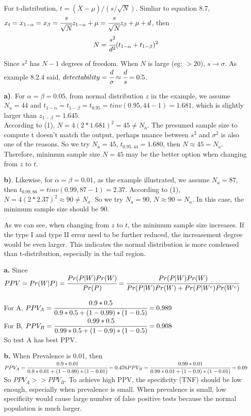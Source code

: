 \documentclass[12pt,a4paper]{article}
\begin{document}
For t-distribution, $t=(\overline{X}-\mu)/(s/\sqrt{N})$. Simliar to equation 8.7, \\ 
$x_t=x_{1-\alpha}=x_{\beta}=\cfrac{s}{\sqrt{N}}z_{1-\alpha}+\mu=\cfrac{s}{\sqrt{N}}z_{\beta}+\mu+d$, then
\begin{equation}
N=\cfrac{s^2}{d^2}(t_{1-\alpha}+t_{1-\beta})^2
\end{equation}

\noindent Since $s^2$ has $N-1$ degrees of freedom. When $N$ is large (eg: $>20$), $s\rightarrow \sigma$. As example 8.2.4 said, $detectability=\cfrac{d}{\sigma}\approx\cfrac{d}{s}=0.5$. 

\textbf{a)}. For $\alpha=\beta=0.05$, from normal distribution $z$ in the example, we assume $N_a=44$ and $t_{1-\alpha}=t_{1-\beta}=t_{0.95}=tinv(0.95,44-1)=1.681$, which is slightly larger than $z_{1-\beta}=1.645$. \\
According to (1), $N=4(2*1.681)^2=45\ne N_a$. The presumed sample size to compute t doesn't match the output, perhaps nuance between $s^2$ and $\sigma^2$ is also one of the reasons. So we try $N_a=45$, $t_{0.95,44}=1.680$, then $N\approx45=N_a$. Therefore, minimum sample size $N=45$ may be the better option when changing from  $z$ to $t$.

\textbf{b)}. Likewise, for $\alpha=\beta=0.01$, as the example illustrated, we assume $N_a=87$, then $t_{0.99,86}=tinv(0.99,87-1)=2.37$. According to (1), $N=4(2*2.37)^2\approx90\ne N_a$. So we try $N_a=90$, $N\approx90=N_a$. In this case, the minimum sample size should be 90.

As we can see, when changing from $z$ to $t$, the minimum sample size increases. If the type I and type II error need to be further reduced, the increasement degree would be even larger. This indicates the normal distribution is more condensed than t-distribution, especially in the tail region. 

\newpage
{}
\textbf{a.} Since $PPV=Pr(W|P)\\=\cfrac{Pr(P|W)Pr(W)}{Pr(P)}=\cfrac{Pr(P|W)Pr(W)}{Pr(P|W)Pr(W)+Pr(P|W^c)Pr(W^c)}$

\noindent For A, $PPV_A=\cfrac{0.9*0.5}{0.9*0.5+(1-0.99)*(1-0.5)}=0.989$\\
For B, $PPV_B=\cfrac{0.99*0.5}{0.99*0.5+(1-0.9)*(1-0.5)}=0.908$\\
So test A has best PPV.

\noindent \textbf{b.} When Prevalence is 0.01, then \\
$PPV_A=\cfrac{0.9*0.01}{0.9*0.01+(1-0.99)*(1-0.01)}=0.476\\
PPV_B=\cfrac{0.99*0.01}{0.99*0.01+(1-0.9)*(1-0.01)}=0.09$\\
So $PPV_A>>PPV_B$. To achieve high PPV, the specificity (TNF) should be low enough, especially when prevalence is small. When prevalence is small, low specificity would cause large number of false positive tests because the normal population is much larger. 
\end{document}
